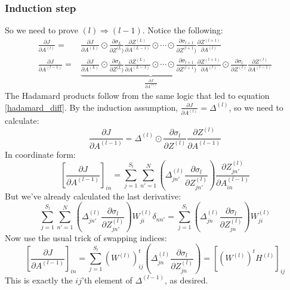 \documentclass[12pt, a4paper]{article}
\numberwithin{equation}{section}
\begin{document}
\subsubsection{Induction step}
So we need to prove $(l)\Rightarrow(l-1)$. Notice the following:
\begin{align}
\frac{\partial J}{\partial A^{(l)}}=&\frac{\partial J}{\partial A^{(L)}}\odot\frac{\partial\sigma_L}{\partial Z^{(L})}\frac{\partial Z^{(L)}}{\partial A^{(L-1)}}\odot\cdots\odot\frac{\partial\sigma_{l+1}}{\partial Z^{(l+1})}\frac{\partial Z^{(l+1)}}{\partial A^{(l)}}\\
\frac{\partial J}{\partial A^{(l-1)}}=&\underbrace{\frac{\partial J}{\partial A^{(L)}}\odot\frac{\partial\sigma_L}{\partial Z^{(L})}\frac{\partial Z^{(L)}}{\partial A^{(L-1)}}\odot\cdots\odot\frac{\partial\sigma_{l+1}}{\partial Z^{(l+1})}\frac{\partial Z^{(l+1)}}{\partial A^{(l)}}}_{\frac{\partial J}{\partial A^{(l)}}}\odot\frac{\partial\sigma_{l}}{\partial Z^{(l)}}\frac{\partial Z^{(l)}}{\partial A^{(l-1)}}
\end{align}
The Hadamard products follow from the same logic that led to equation \ref{hadamard_diff}. By the induction assumption, $\frac{\partial J}{\partial A^{(l)}}=\Delta^{(l)}$, so we need to calculate:
\begin{equation}
\frac{\partial J}{\partial A^{(l-1)}}=\Delta^{(l)}\odot\frac{\partial\sigma_l}{\partial Z^{(l)}}\frac{\partial Z^{(l)}}{\partial A^{(l-1)}}
\end{equation}
In coordinate form:
\begin{equation}
\left[\frac{\partial J}{\partial A^{(l-1)}}\right]_{in}=\sum_{j=1}^{S_l}\sum_{n'=1}^N\left(\Delta^{(l)}_{jn'}\frac{\partial\sigma_l}{\partial Z^{(l)}_{jn'}}\right)\frac{\partial Z^{(l)}_{jn'}}{\partial A^{(l-1)}_{in}}
\end{equation}
But we've already calculated the last derivative:
\begin{equation}
\sum_{j=1}^{S_l}\sum_{n'=1}^N\left(\Delta^{(l)}_{jn'}\frac{\partial\sigma_l}{\partial Z^{(l)}_{jn'}}\right)W^{(l)}_{ji}\delta_{nn'}=\sum_{j=1}^{S_l}\left(\Delta^{(l)}_{jn}\frac{\partial\sigma_l}{\partial Z^{(l)}_{jn}}\right)W^{(l)}_{ji}
\end{equation}
Now use the usual trick of swapping indices:
\begin{equation}
\left[\frac{\partial J}{\partial A^{(l-1)}}\right]_{in}=\sum_{j=1}^{S_l}\left(W^{(l)}\right)^t_{ij}\left(\Delta^{(l)}_{jn}\frac{\partial\sigma_l}{\partial Z^{(l)}_{jn}}\right)=\left[\left(W^{(l)}\right)^t H^{(l)}\right]_{ij}
\end{equation}
This is exactly the $ij$'th element of $\Delta^{(l-1)}$, as desired.
\end{document}
